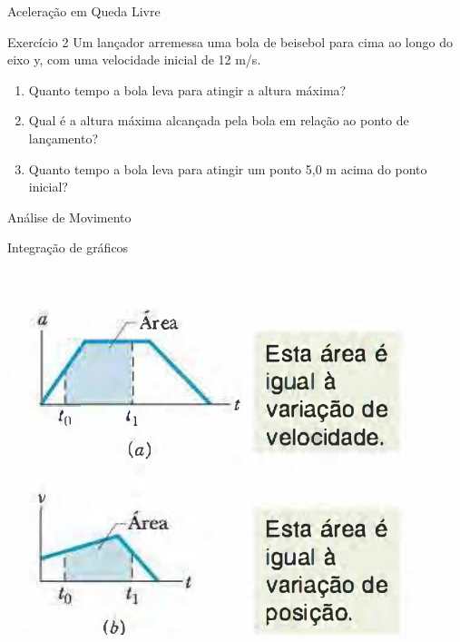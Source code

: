 \documentclass[xcolor=dvipsnames,table]{beamer}
\begin{document}
	\begin{frame}{Aceleração em Queda Livre}
		\begin{block}{Exercício 2}
			Um lançador arremessa uma bola de beisebol
			para cima ao longo do eixo  y,  com uma velocidade inicial
			de 12 m/s. \pause 
			\begin{enumerate}
				\item Quanto tempo a bola leva para atingir a altura máxima? \pause
				\item Qual é a altura máxima alcançada pela bola em relação ao ponto de lançamento? \pause
				\item Quanto tempo a bola leva para atingir um ponto 5,0 m acima do ponto inicial?
			\end{enumerate}
		\end{block}
	\end{frame}

	\begin{frame}{Análise de Movimento}
		\begin{block}{Integração de gráficos}
			\begin{center}
				\includegraphics[scale=0.5]{images/fig2-12}
			\end{center}
		\end{block}
	\end{frame}
\end{document}
